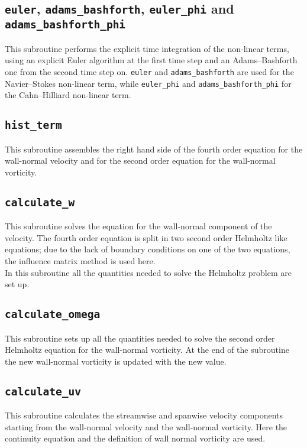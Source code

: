 \subsection{\texttt{euler}, \texttt{adams\_bashforth}, \texttt{euler\_phi} and \texttt{adams\_bashforth\_phi}}
This subroutine performs the explicit time integration of the non-linear terms, using an explicit Euler algorithm at the first time step and an Adams--Bashforth one from the second time step on. \texttt{euler} and \texttt{adams\_bashforth} are used for the Navier--Stokes non-linear term, while \texttt{euler\_phi} and \texttt{adams\_bashforth\_phi} for the Cahn--Hilliard non-linear term.

\subsection{\texttt{hist\_term}}
This subroutine assembles the right hand side of the fourth order equation for the wall-normal velocity and for the second order equation for the wall-normal vorticity.

\subsection{\texttt{calculate\_w}}
This subroutine solves the equation for the wall-normal component of the velocity. The fourth order equation is split in two second order Helmholtz like equations; due to the lack of boundary conditions on one of the two equations, the influence matrix method is used here.\\
In this subroutine all the quantities needed to solve the Helmholtz problem are set up.

\subsection{\texttt{calculate\_omega}}
This subroutine sets up all the quantities needed to solve the second order Helmholtz equation for the wall-normal vorticity. At the end of the subroutine the new wall-normal vorticity is updated with the new value.

\subsection{\texttt{calculate\_uv}}
This subroutine calculates the streamwise and spanwise velocity components starting from the wall-normal velocity and the wall-normal vorticity. Here the continuity equation and the definition of wall normal vorticity are used.

